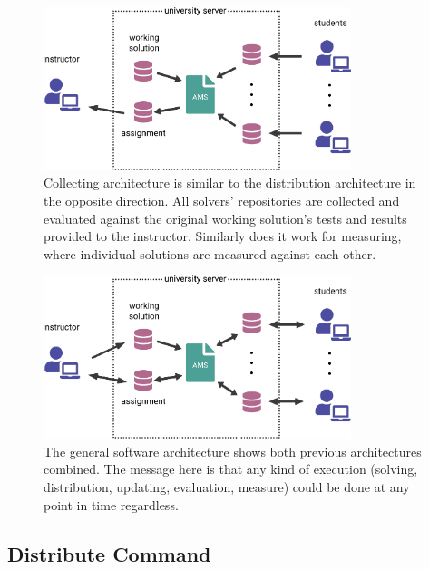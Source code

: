 \begin{figure}[H]
    \centering
    \includegraphics[width=0.8\textwidth,height=\textheight,keepaspectratio]{Figures/impl/image4.png}
    \caption[Collecting architecture diagram]{Collecting architecture is similar to the distribution architecture in the opposite direction. All solvers' repositories are collected and evaluated against the original working solution's tests and results provided to the instructor. Similarly does it work for measuring, where individual solutions are measured against each other.}
\end{figure}

\begin{figure}[H]
    \centering
    \includegraphics[width=0.8\textwidth,height=\textheight,keepaspectratio]{Figures/impl/image8.png}
    \caption[The general software architecture diagram]{The general software architecture shows both previous architectures combined. The message here is that any kind of execution (solving, distribution, updating, evaluation, measure) could be done at any point in time regardless.}
\end{figure}

\subsection{Distribute Command}\label{ssec:distribcmd}

